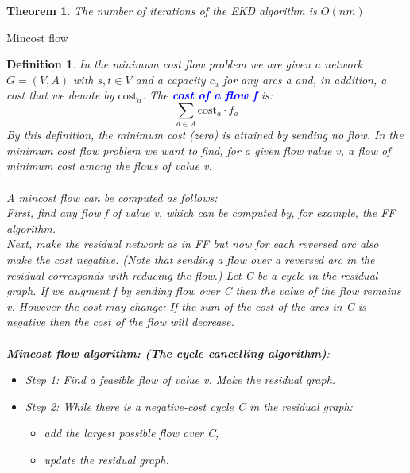 \documentclass[10pt]{report}
\makeatletter
\numberwithin{dummy}{section}
\theoremstyle{ocrenumbox}
\newtheorem{definitionTTT}{Theorem}[]
\theoremstyle{grayman}
\newtheorem{definitionTTTT}{Definition}[]
\newenvironment{thm}{\begin{tBox}\begin{definitionTTT}}{\end{definitionTTT}\end{tBox}}
\newenvironment{voc}{\begin{vBox}\begin{definitionTTTT}}{\end{definitionTTTT}\end{vBox}}
\renewcommand{\subsection}{\@startsection {subsection}{2}{\z@}
{-3ex \@plus -0.1ex \@minus -.4ex}
{0.5ex \@plus.2ex }
{\normalfont\sffamily\bfseries}}
\makeatother
\begin{document}
\begin{thm}
    The number of iterations of the EKD algorithm is $O(nm)$
\end{thm}

\subsection{Mincost flow}

\begin{voc}
    In the minimum cost flow problem we are given a network $G = (V,A)$ with $s, t \in V$ and a capacity $c_a$ for any arcs a and, in addition, a cost that we denote by $\mbox{cost}_a$. The \textbf{\textcolor{blue}{cost of a flow f}} is:
    \[\sum_{a\in A} \mbox{cost}_a \cdot f_a\]
    By this definition, the minimum cost (zero) is attained by sending no flow.
In the minimum cost flow problem we want to find, for a given flow value v, a flow of minimum cost among the flows of value v.\\ \\
A mincost flow can be computed as follows:\\First, find any flow f of value
v, which can be computed by, for example, the FF algorithm.\\ Next, make
the residual network as in FF but now for each reversed arc also make the cost negative. (Note that sending a flow over a reversed arc in the residual
corresponds with reducing the flow.) Let C be a cycle in the residual graph.
If we augment f by sending flow over C then the value of the flow remains
v. However the cost may change: If the sum of the cost of the arcs in C is
negative then the cost of the flow will decrease.\\ \\
\textbf{Mincost flow algorithm: (The cycle cancelling algorithm)}:
\begin{itemize}
    \item Step 1: Find a feasible flow of value v. Make the residual graph.
    \item Step 2: While there is a negative-cost cycle C in the residual graph:\begin{itemize}
        \item add the largest possible flow over C,
        \item update the residual graph.
    \end{itemize}
\end{itemize}

\end{voc}
\end{document}
